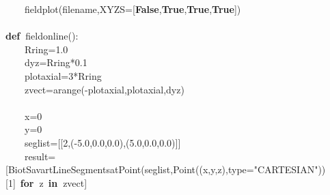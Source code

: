 \documentclass{article}
\newcommand{\hlstd}[1]{\textcolor[rgb]{0,0,0}{#1}}
\newcommand{\hlnum}[1]{\textcolor[rgb]{0.16,0.16,1}{#1}}
\newcommand{\hlstr}[1]{\textcolor[rgb]{1,0,0}{#1}}
\newcommand{\hlsym}[1]{\textcolor[rgb]{0,0,0}{#1}}
\newcommand{\hlkwa}[1]{\textcolor[rgb]{0,0,0}{\bf{#1}}}
\newcommand{\hlkwb}[1]{\textcolor[rgb]{0.51,0,0}{#1}}
\newcommand{\hlkwd}[1]{\textcolor[rgb]{0,0,0.51}{#1}}
\begin{document}
\hlstd{}\hlstd{\ \ \ \ }\hlstd{}\hlkwd{fieldplot}\hlstd{}\hlsym{(}\hlstd{filename}\hlsym{,}\hlstd{XYZS}\hlsym{={[}}\hlstd{}\hlkwa{False}\hlstd{}\hlsym{,}\hlstd{}\hlkwa{True}\hlstd{}\hlsym{,}\hlstd{}\hlkwa{True}\hlstd{}\hlsym{,}\hlstd{}\hlkwa{True}\hlstd{}\hlsym{{]})}\hspace*{\fill}\\
\hlstd{}\hspace*{\fill}\\
\hlkwa{def\ }\hlstd{}\hlkwd{fieldonline}\hlstd{}\hlsym{():}\hspace*{\fill}\\
\hlstd{}\hlstd{\ \ \ \ }\hlstd{Rring}\hlsym{=}\hlstd{}\hlnum{1.0}\hspace*{\fill}\\
\hlstd{}\hlstd{\ \ \ \ }\hlstd{dyz}\hlsym{=}\hlstd{Rring}\hlsym{{*}}\hlstd{}\hlnum{0.1}\hspace*{\fill}\\
\hlstd{}\hlstd{\ \ \ \ }\hlstd{plotaxial}\hlsym{=}\hlstd{}\hlnum{3}\hlstd{}\hlsym{{*}}\hlstd{Rring\hspace*{\fill}\\
}\hlstd{\ \ \ \ }\hlstd{zvect}\hlsym{=}\hlstd{}\hlkwd{arange}\hlstd{}\hlsym{({-}}\hlstd{plotaxial}\hlsym{,}\hlstd{plotaxial}\hlsym{,}\hlstd{dyz}\hlsym{)}\hspace*{\fill}\\
\hlstd{\hspace*{\fill}\\
}\hlstd{\ \ \ \ }\hlstd{x}\hlsym{=}\hlstd{}\hlnum{0}\hspace*{\fill}\\
\hlstd{}\hlstd{\ \ \ \ }\hlstd{y}\hlsym{=}\hlstd{}\hlnum{0}\hspace*{\fill}\\
\hlstd{}\hlstd{\ \ \ \ }\hlstd{seglist}\hlsym{={[}{[}}\hlstd{}\hlnum{2}\hlstd{}\hlsym{,({-}}\hlstd{}\hlnum{5.0}\hlstd{}\hlsym{,}\hlstd{}\hlnum{0.0}\hlstd{}\hlsym{,}\hlstd{}\hlnum{0.0}\hlstd{}\hlsym{),(}\hlstd{}\hlnum{5.0}\hlstd{}\hlsym{,}\hlstd{}\hlnum{0.0}\hlstd{}\hlsym{,}\hlstd{}\hlnum{0.0}\hlstd{}\hlsym{){]}{]}}\hspace*{\fill}\\
\hlstd{}\hlstd{\ \ \ \ }\hlstd{result}\hlsym{={[}}\hlstd{}\hlkwd{\textunderscore Biot\textunderscore Savart\textunderscore LineSegments\textunderscore at\textunderscore Point}\hlstd{}\hlsym{(}\hlstd{seglist}\hlsym{,}\hlstd{}\hlkwd{Point}\hlstd{}\hlsym{((}\hlstd{x}\hlsym{,}\hlstd{y}\hlsym{,}\hlstd{z}\hlsym{),}\hlstd{}\hlkwb{type}\hlstd{}\hlsym{=}\hlstd{}\hlstr{"CARTESIAN"}\hlstd{}\hlsym{)){[}}\hlstd{}\hlnum{1}\hlstd{}\hlsym{{]}\ }\hlstd{}\hlkwa{for\ }\hlstd{z\ }\hlkwa{in\ }\hlstd{zvect}\hlsym{{]}}\hspace*{\fill}\\
\end{document}
